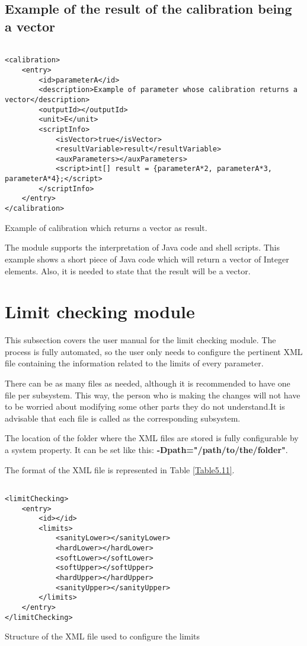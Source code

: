\subsection{Example of the result of the calibration being a vector}

 \begin{table}[H]
\lstset{language=XML}
\begin{lstlisting}

<calibration>
	<entry>
		<id>parameterA</id>
		<description>Example of parameter whose calibration returns a vector</description>
		<outputId></outputId>
		<unit>E</unit>
		<scriptInfo>
			<isVector>true</isVector>
			<resultVariable>result</resultVariable>
			<auxParameters></auxParameters>
			<script>int[] result = {parameterA*2, parameterA*3, parameterA*4};</script>
		</scriptInfo>
	</entry>
</calibration>
\end{lstlisting}
\caption{Example of calibration which returns a vector as result.} 
\label{Table5.10}
\end{table}

The module supports the interpretation of Java code and shell scripts. This example shows a short piece of Java code which will return a vector of Integer elements. Also, it is needed to state that the result will be a vector.




\section{Limit checking module}
This subsection covers the user manual for the limit checking module. The process is fully automated, so the user only needs to configure the pertinent XML file containing the information related to the limits of every parameter. 

There can be as many files as needed, although it is recommended to have one file per subsystem. This way, the person who is making the changes will not have to be worried about modifying some other parts they do not understand.It is advisable that each file is called as the corresponding subsystem.

The location of the folder where the XML files are stored is fully configurable by a system property. It can be set like this: \textbf{-Dpath="/path/to/the/folder"}.
\pagebreak

The format of the XML file is represented in Table \ref{Table5.11}.
\begin{table}[H]
\lstset{language=XML}
\begin{lstlisting}

<limitChecking>
	<entry>
		<id></id>
		<limits>
			<sanityLower></sanityLower>
			<hardLower></hardLower>
			<softLower></softLower>
			<softUpper></softUpper>
			<hardUpper></hardUpper>
			<sanityUpper></sanityUpper>
		</limits>
	</entry>
</limitChecking>
\end{lstlisting}
\caption{Structure of the XML file used to configure the limits}
\label{Table5.11}
\end{table}

